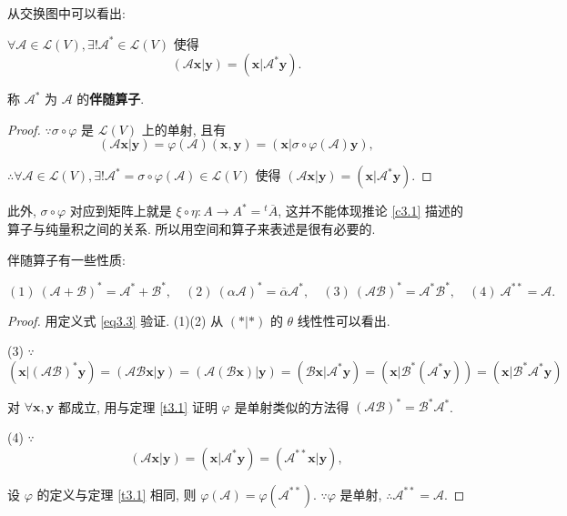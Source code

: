 \documentclass[color=black,device=normal,lang=cn,mode=geye]{elegantnote}
\begin{document}
从交换图中可以看出:
\begin{corollary}\label{c3.1}
    $\forall\mathcal{A}\in\mathcal{L}(V),\exists!\mathcal{A}^*\in\mathcal{L}(V)$ 使得
    \begin{equation}\label{eq3.3}
        (\mathcal{A}\boldsymbol{x}|\boldsymbol{y})=(\boldsymbol{x}|\mathcal{A}^*\boldsymbol{y}).
    \end{equation}

    称 $\mathcal{A}^*$ 为 $\mathcal{A}$ 的\textbf{伴随算子}.
\end{corollary}
\begin{proof}
    $\because\sigma\circ\varphi$ 是 $\mathcal{L}(V)$ 上的单射, 且有
    \[(\mathcal{A}\boldsymbol{x}|\boldsymbol{y})=\varphi(\mathcal{A})(\boldsymbol{x},\boldsymbol{y})=(\boldsymbol{x}|\sigma\circ\varphi(\mathcal{A})\boldsymbol{y}),\]

    $\therefore\forall\mathcal{A}\in\mathcal{L}(V),\exists!\mathcal{A}^*=\sigma\circ\varphi(\mathcal{A})\in\mathcal{L}(V)$ 使得 $(\mathcal{A}\boldsymbol{x}|\boldsymbol{y})=(\boldsymbol{x}|\mathcal{A}^*\boldsymbol{y})$.
\end{proof}
此外, $\sigma\circ\varphi$ 对应到矩阵上就是 $\xi\circ\eta:A\to A^*={}^t\overline{A}$, 这并不能体现推论 \ref{c3.1} 描述的算子与纯量积之间的关系. 所以用空间和算子来表述是很有必要的.

伴随算子有一些性质:
\begin{property}
    \[(1)\ (\mathcal{A}+\mathcal{B})^*=\mathcal{A}^*+\mathcal{B}^*,\quad(2)\ (\alpha\mathcal{A})^*=\overline{\alpha}\mathcal{A}^*,\quad(3)\ (\mathcal{A}\mathcal{B})^*=\mathcal{A}^*\mathcal{B}^*,\quad(4)\ \mathcal{A}^{**}=\mathcal{A}.\]
\end{property}
\begin{proof}
    用定义式 \ref{eq3.3} 验证. (1)(2) 从 $(*|*)$ 的 $\theta$ 线性性可以看出.

    (3) $\because$
    \[(\boldsymbol{x}|(\mathcal{A}\mathcal{B})^*\boldsymbol{y})=(\mathcal{A}\mathcal{B}\boldsymbol{x}|\boldsymbol{y})=(\mathcal{A}(\mathcal{B}\boldsymbol{x})|\boldsymbol{y})=(\mathcal{B}\boldsymbol{x}|\mathcal{A}^*\boldsymbol{y})=(\boldsymbol{x}|\mathcal{B}^*(\mathcal{A}^*\boldsymbol{y}))=(\boldsymbol{x}|\mathcal{B}^*\mathcal{A}^*\boldsymbol{y})\]

    对 $\forall\boldsymbol{x},\boldsymbol{y}$ 都成立, 用与定理 \ref{t3.1} 证明 $\varphi$ 是单射类似的方法得 $(\mathcal{A}\mathcal{B})^*=\mathcal{B}^*\mathcal{A}^*$.

    (4) $\because$
    \[(\mathcal{A}\boldsymbol{x}|\boldsymbol{y})=(\boldsymbol{x}|\mathcal{A}^*\boldsymbol{y})=(\mathcal{A}^{**}\boldsymbol{x}|\boldsymbol{y}),\]

    设 $\varphi$ 的定义与定理 \ref{t3.1} 相同, 则 $\varphi(\mathcal{A})=\varphi(\mathcal{A}^{**})$. $\because\varphi$ 是单射, $\therefore\mathcal{A}^{**}=\mathcal{A}$.
\end{proof}
\end{document}
